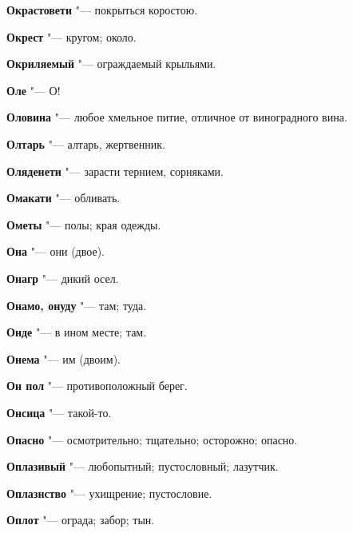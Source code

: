 \begin{mymulticols}{2}
\noindent\textbf{Окрастовети} "--- покрыться коростою. 




\noindent\textbf{Окрест} "--- кругом; около. 




\noindent\textbf{Окриляемый} "--- ограждаемый крыльями. 




\noindent\textbf{Оле} "--- О! 




\noindent\textbf{Оловина} "--- любое хмельное питие, отличное от виноградного вина. 




\noindent\textbf{Олтарь} "--- алтарь, жертвенник. 




\noindent\textbf{Оляденети} "--- зарасти тернием, сорняками. 




\noindent\textbf{Омакати} "--- обливать. 




\noindent\textbf{Ометы} "--- полы; края одежды. 




\noindent\textbf{Она} "--- они (двое). 




\noindent\textbf{Онагр} "--- дикий осел. 




\noindent\textbf{Онамо, онуду} "--- там; туда. 




\noindent\textbf{Онде} "--- в ином месте; там. 




\noindent\textbf{Онема} "--- им (двоим). 




\noindent\textbf{Он пол} "--- противоположный берег. 




\noindent\textbf{Онсица} "--- такой-то. 




\noindent\textbf{Опасно} "--- осмотрительно; тщательно; осторожно; опасно. 




\noindent\textbf{Оплазивый} "--- любопытный; пустословный; лазутчик. 




\noindent\textbf{Оплазнство} "--- ухищрение; пустословие. 




\noindent\textbf{Оплот} "--- ограда; забор; тын. 





\end{mymulticols}
